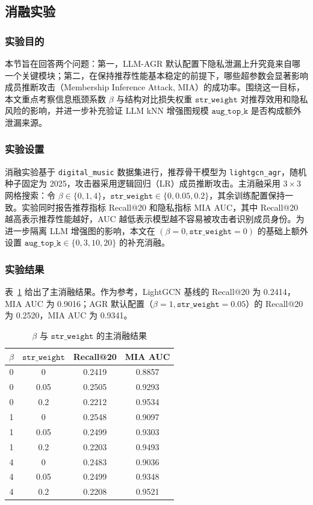 \subsection{消融实验}

\subsubsection{实验目的}
本节旨在回答两个问题：第一，LLM-AGR 默认配置下隐私泄漏上升究竟来自哪一个关键模块；第二，在保持推荐性能基本稳定的前提下，哪些超参数会显著影响成员推断攻击（Membership Inference Attack, MIA）的成功率。围绕这一目标，本文重点考察信息瓶颈系数 $\beta$ 与结构对比损失权重 $\texttt{str\_weight}$ 对推荐效用和隐私风险的影响，并进一步补充验证 LLM kNN 增强图规模 $\texttt{aug\_top\_k}$ 是否构成额外泄漏来源。

\subsubsection{实验设置}
消融实验基于 \texttt{digital\_music} 数据集进行，推荐骨干模型为 \texttt{lightgcn\_agr}，随机种子固定为 2025，攻击器采用逻辑回归（LR）成员推断攻击。主消融采用 $3 \times 3$ 网格搜索：令 $\beta \in \{0,1,4\}$，$\texttt{str\_weight} \in \{0,0.05,0.2\}$，其余训练配置保持一致。实验同时报告推荐指标 Recall@20 和隐私指标 MIA AUC，其中 Recall@20 越高表示推荐性能越好，AUC 越低表示模型越不容易被攻击者识别成员身份。为进一步隔离 LLM 增强图的影响，本文在 $(\beta=0,\texttt{str\_weight}=0)$ 的基础上额外设置 $\texttt{aug\_top\_k} \in \{0,3,10,20\}$ 的补充消融。

\subsubsection{实验结果}
表~\ref{tab:ablation-beta-str} 给出了主消融结果。作为参考，LightGCN 基线的 Recall@20 为 0.2414，MIA AUC 为 0.9016；AGR 默认配置（$\beta=1,\texttt{str\_weight}=0.05$）的 Recall@20 为 0.2520，MIA AUC 为 0.9341。

\begin{table}[htbp]
\centering
\caption{$\beta$ 与 $\texttt{str\_weight}$ 的主消融结果}
\label{tab:ablation-beta-str}
\begin{tabular}{cccc}
\hline
$\beta$ & $\texttt{str\_weight}$ & Recall@20 & MIA AUC \\
\hline
0 & 0    & 0.2419 & 0.8857 \\
0 & 0.05 & 0.2505 & 0.9293 \\
0 & 0.2  & 0.2212 & 0.9534 \\
1 & 0    & 0.2548 & 0.9097 \\
1 & 0.05 & 0.2499 & 0.9303 \\
1 & 0.2  & 0.2203 & 0.9493 \\
4 & 0    & 0.2483 & 0.9036 \\
4 & 0.05 & 0.2499 & 0.9348 \\
4 & 0.2  & 0.2208 & 0.9521 \\
\hline
\end{tabular}
\end{table}

